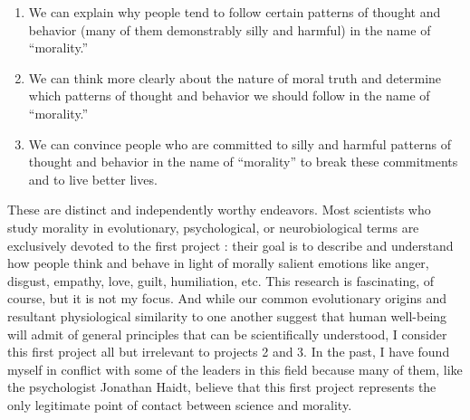 \documentclass[a4paper,14pt]{extarticle}
\begin{document}
\begin{enumerate}
      \item We can explain why people tend to follow certain patterns of thought and behavior (many of them demonstrably silly and harmful) in the name of ``morality.''
      \item We can think more clearly about the nature of moral truth and determine which patterns of thought and behavior we should follow in the name of ``morality.''
      \item We can convince people who are committed to silly and harmful patterns of thought and behavior in the name of ``morality'' to break these commitments and to live better lives.
\end{enumerate}

These are distinct and independently worthy endeavors.
Most scientists who study morality in evolutionary, psychological, or neurobiological terms are exclusively devoted to the first project :
their goal is to describe and understand how people think and behave in light of morally salient emotions like anger, disgust, empathy, love, guilt, humiliation, etc.
This research is fascinating, of course, but it is not my focus.
And while our common evolutionary origins and resultant physiological similarity to one another suggest that human well-being will admit of general principles that can be scientifically understood, I consider this first project all but irrelevant to projects 2 and 3.
In the past, I have found myself in conflict with some of the leaders in this field because many of them, like the psychologist Jonathan Haidt, believe that this first project represents the only legitimate point of contact between science and morality.
\end{document}

